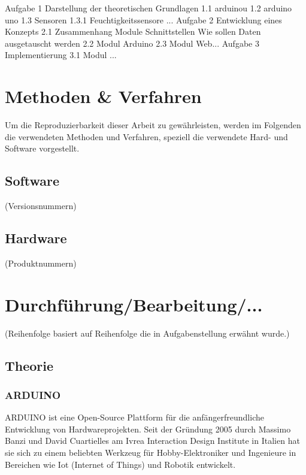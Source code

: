 \documentclass[
    load-dhbw-templates,
    load-preamble = true,
    auto-intro-pages = all,
    add-tocs-to-toc,
    debug = true,
    language = english,
    mainlanguage = ngerman,
    add-bibliography,
    bib-file = dhbw-source.bib,
    biblatex/style = numeric,
    print- = false
]{iodhbwm}
\begin{document}
    Aufgabe 1 
    Darstellung der theoretischen Grundlagen
    1.1 arduinou
    1.2 arduino uno
    1.3 Sensoren
    1.3.1 Feuchtigkeitssensore
    ...
    Aufgabe 2
    Entwicklung eines Konzepts
    2.1 Zusammenhang Module
    Schnittstellen
    Wie sollen Daten ausgetauscht werden
    2.2 Modul Arduino
    2.3 Modul Web...
    Aufgabe 3
    Implementierung
    3.1 Modul ... 
    





\chapter{Methoden \& Verfahren}
    Um die Reproduzierbarkeit dieser Arbeit zu gewährleisten, werden im Folgenden die verwendeten Methoden und Verfahren, speziell die verwendete Hard- und Software vorgestellt.
    
    \section{Software}
        (Versionsnummern)
    \section{Hardware}
        (Produktnummern)
    


\chapter{Durchführung/Bearbeitung/...}

(Reihenfolge basiert auf Reihenfolge die in Aufgabenstellung erwähnt wurde.)

    \section{Theorie}
        \subsection{ARDUINO}
        ARDUINO ist eine Open-Source Plattform für die anfängerfreundliche Entwicklung von Hardwareprojekten.
        Seit der Gründung 2005 durch Massimo Banzi und David Cuartielles am Ivrea Interaction Design Institute in Italien hat sie sich zu einem beliebten Werkzeug für Hobby-Elektroniker und Ingenieure in Bereichen wie Iot (Internet of Things) und Robotik entwickelt.  %
       
\end{document}
